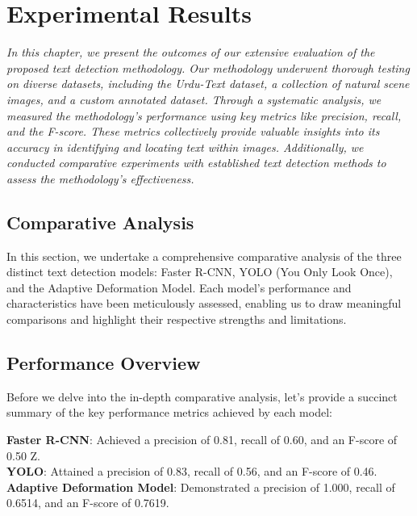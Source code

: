 \setlength{\footskip}{8mm}

\chapter{Experimental Results}
\label{ch:results}

  \textit{In this chapter, we present the outcomes of our extensive evaluation of the proposed text detection methodology. Our methodology underwent thorough testing on diverse datasets, including the Urdu-Text dataset, a collection of natural scene images, and a custom annotated dataset. Through a systematic analysis, we measured the methodology's performance using key metrics like precision, recall, and the F-score. These metrics collectively provide valuable insights into its accuracy in identifying and locating text within images. Additionally, we conducted comparative experiments with established text detection methods to assess the methodology's effectiveness.}

\section{Comparative Analysis}
\label{Comparative Analysis}
In this section, we undertake a comprehensive comparative analysis of the three distinct text detection models: Faster R-CNN, YOLO (You Only Look Once), and the Adaptive Deformation Model. Each model's performance and characteristics have been meticulously assessed, enabling us to draw meaningful comparisons and highlight their respective strengths and limitations.

\section{Performance Overview}

Before we delve into the in-depth comparative analysis, let's provide a succinct summary of the key performance metrics achieved by each model:

\textbf{Faster R-CNN}: Achieved a precision of 0.81, recall of 0.60, and an F-score of 0.50
Z. \\
\textbf{YOLO}: Attained a precision of 0.83, recall of 0.56, and an F-score of 0.46. \\
\textbf{Adaptive Deformation Model}: Demonstrated a precision of 1.000, recall of 0.6514, and an F-score of 0.7619.


